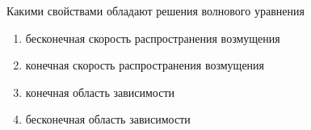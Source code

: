 Какими свойствами обладают решения волнового уравнения

\begin{enumerate}[label=\arabic*)]
    \item бесконечная скорость распространения возмущения
    \item конечная скорость распространения возмущения
    \item конечная область зависимости
    \item бесконечная область зависимости
\end{enumerate}

